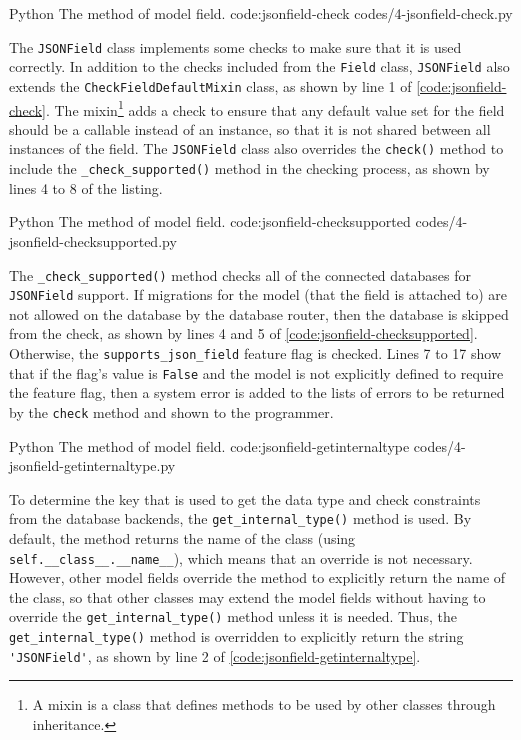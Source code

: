 \listing
{Python}
{The  method of  model field.}
{code:jsonfield-check}
{codes/4-jsonfield-check.py}

The \verb|JSONField| class implements some checks to make sure that it is used
correctly. In addition to the checks included from the \verb|Field| class,
\verb|JSONField| also extends the \verb|CheckFieldDefaultMixin| class, as shown
by line 1 of \autoref{code:jsonfield-check}. The mixin\footnote{A mixin is a
class that defines methods to be used by other classes through inheritance.}
adds a check to ensure that any default value set for the field should be a
callable instead of an instance, so that it is not shared between all instances
of the field. The \verb|JSONField| class also overrides the \verb|check()|
method to include the \verb|_check_supported()| method in the checking process,
as shown by lines 4 to 8 of the listing.

\listing
{Python}
{The  method of  model field.}
{code:jsonfield-checksupported}
{codes/4-jsonfield-checksupported.py}

The \verb|_check_supported()| method checks all of the connected databases for
\verb|JSONField| support. If migrations for the model (that the field is
attached to) are not allowed on the database by the database router, then the
database is skipped from the check, as shown by lines 4 and 5 of
\autoref{code:jsonfield-checksupported}. Otherwise, the
\verb|supports_json_field| feature flag is checked. Lines 7 to 17 show that if
the flag's value is \verb|False| and the model is not explicitly defined to
require the feature flag, then a system error is added to the lists of errors
to be returned by the \verb|check| method and shown to the programmer.

\listing
{Python}
{The  method of  model field.}
{code:jsonfield-getinternaltype}
{codes/4-jsonfield-getinternaltype.py}

To determine the key that is used to get the data type and check constraints
from the database backends, the \verb|get_internal_type()| method is used. By
default, the method returns the name of the class (using
\verb|self.__class__.__name__|), which means that an override is not necessary.
However, other model fields override the method to explicitly return the name
of the class, so that other classes may extend the model fields without having
to override the \verb|get_internal_type()| method unless it is needed. Thus,
the \verb|get_internal_type()| method is overridden to explicitly return the
string \verb|'JSONField'|, as shown by line 2 of
\autoref{code:jsonfield-getinternaltype}.

